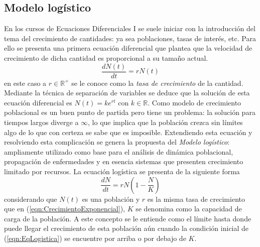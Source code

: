 \subsection{Modelo logístico}

En los cursos de Ecuaciones Diferenciales I se suele iniciar con la introducción del tema del crecimiento de cantidades: ya sea poblaciones, tasas de interés, etc. Para ello se presenta una primera ecuación diferencial que plantea que la velocidad de crecimiento de dicha cantidad es proporcional a su tamaño actual.
\begin{equation}\label{eqn:CrecimientoExponencial}
	\frac{dN(t)}{dt}=rN(t)
\end{equation}
en este caso a $r\in\mathbb{R}^+$ se le conoce como la \textit{tasa de crecimiento} de la cantidad. Mediante la técnica de separación de variables se deduce que la solución de esta ecuación diferencial es $N(t)=ke^{rt}$ con $k\in\mathbb{R}$. Como modelo de crecimiento poblacional es un buen punto de partida pero tiene un problema: la solución para tiempos largos diverge a $\infty$, lo que implica que la población crezca sin límites algo de lo que con certeza se sabe que es imposible. Extendiendo esta ecuación y resolviendo esta complicación se genera la propuesta del \textit{Modelo logístico}: ampliamente utilizado como base para el análisis de dinámica poblacional, propagación de enfermedades y en esencia sistemas que presenten crecimiento limitado por recursos. La ecuación logística se presenta de la siguiente forma
\begin{equation}\label{eqn:EqLogistica}
	\frac{dN}{dt}=rN\left (1-\frac{N}{K}\right )
\end{equation}
considerando que $N(t)$ es una población y $r$ es la misma tasa de crecimiento que en (\ref{eqn:CrecimientoExponencial}), $K$ se denomina como la capacidad de carga de la población. A este concepto se le entiende como el límite hasta donde puede llegar el crecimiento de esta población aún cuando la condición inicial de (\ref{eqn:EqLogistica}) se encuentre por arriba o por debajo de $K$. 
